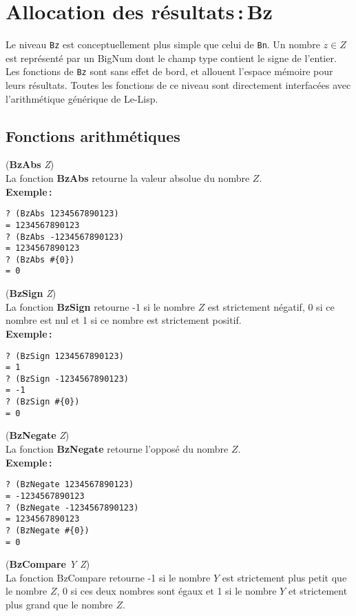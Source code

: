 \section{Allocation des r\'esultats\,:\,Bz}
Le niveau \verb+Bz+ est conceptuellement plus simple que celui de \verb+Bn+.
Un nombre $z \in Z$ est repr\'esent\'e par un BigNum dont le champ type
contient le signe de l'entier.
Les fonctions de \verb+Bz+ sont sans effet de bord, et allouent l'espace
m\'emoire pour leurs r\'esultats. Toutes les fonctions de ce niveau sont
directement interfac\'ees avec l'arithm\'etique g\'en\'erique de Le-Lisp.

\subsection{Fonctions arithm\'etiques}
({\bf BzAbs} {\em Z})
\\[12pt]
La fonction {\bf BzAbs} retourne la valeur absolue du nombre $Z$.
\\[18pt]
{\bf Exemple\,:}
\begin{verbatim}
? (BzAbs 1234567890123)
= 1234567890123
? (BzAbs -1234567890123)
= 1234567890123
? (BzAbs #{0})
= 0
\end{verbatim}
\vspace*{24pt}
({\bf BzSign} {\em Z})
\\[12pt]
La fonction {\bf BzSign} retourne -1 si le nombre $Z$ est strictement
n\'egatif, 0 si ce nombre est nul et 1 si ce nombre est strictement positif.
\\[18pt]
{\bf Exemple\,:}
\begin{verbatim}
? (BzSign 1234567890123)
= 1
? (BzSign -1234567890123)
= -1
? (BzSign #{0})
= 0
\end{verbatim}
\vspace*{24pt}
({\bf BzNegate} {\em Z})
\\[12pt]
La fonction {\bf BzNegate} retourne l'oppos\'e du nombre $Z$.
\\[18pt]
{\bf Exemple\,:}
\begin{verbatim}
? (BzNegate 1234567890123)
= -1234567890123
? (BzNegate -1234567890123)
= 1234567890123
? (BzNegate #{0})
= 0
\end{verbatim}
\vspace*{24pt}
({\bf BzCompare} {\em Y Z})
\\[12pt]
La fonction BzCompare retourne -1 si le nombre $Y$ est strictement
plus petit que le nombre $Z$, 0 si ces deux nombres sont \'egaux et
1 si le nombre $Y$ et strictement plus grand que le nombre
$Z$.
